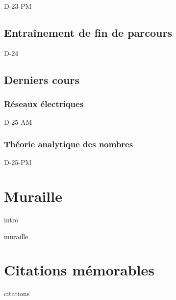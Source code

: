 \documentclass[poly,trombi]{valbonne}
\begin{document}
{D-23-PM}


\section{Entraînement de fin de parcours}

{D-24}


\section{Derniers cours}

\subsection{Réseaux électriques}

{D-25-AM}

\subsection{Théorie analytique des nombres}

{D-25-PM}


















\chapter{Muraille}

{intro}

\newpage


{muraille}




\chapter{Citations mémorables}

{citations}
\end{document}
